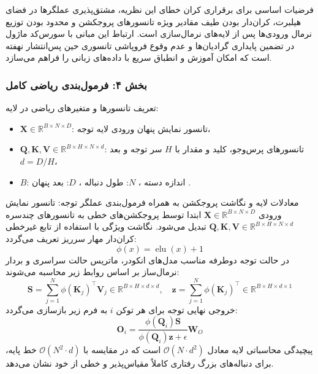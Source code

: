 فرضیات اساسی برای برقراری کران خطای این نظریه، مشتق‌پذیری عملگرها در فضای هیلبرت، کران‌دار بودن طیف مقادیر ویژه تانسورهای پروجکشن و محدود بودن توزیع نرمال ورودی‌ها پس از لایه‌های نرمال‌سازی  است.
ارتباط این مبانی با سورس‌کد ماژول  در تضمین پایداری گرادیان‌ها و عدم وقوع فروپاشی تانسوری حین پس‌انتشار نهفته است که امکان آموزش و انطباق سریع با داده‌های زبانی را فراهم می‌سازد.

\subsubsection*{بخش ۴: فرمول‌بندی ریاضی کامل }
تعریف تانسورها و متغیرهای ریاضی در لایه:
\begin{itemize}
    \item $\mathbf{X} \in \mathbb{R}^{B \times N \times D}$: تانسور نمایش پنهان ورودی لایه توجه،
    \item $\mathbf{Q}, \mathbf{K}, \mathbf{V} \in \mathbb{R}^{B \times H \times N \times d}$: تانسورهای پرس‌وجو، کلید و مقدار با $H$ سر توجه و بعد $d = D/H$،
    \item $B$: اندازه دسته ، $N$: طول دنباله ، $D$: بعد پنهان .
\end{itemize}
معادلات لایه و نگاشت پروجکشن به همراه فرمول‌بندی عملگر توجه:
تانسور نمایش ورودی $\mathbf{X} \in \mathbb{R}^{B \times N \times D}$ ابتدا توسط پروجکشن‌های خطی به تانسورهای چندسره $\mathbf{Q}, \mathbf{K}, \mathbf{V} \in \mathbb{R}^{B \times H \times N \times d}$ تبدیل می‌شود. نگاشت ویژگی با استفاده از تابع غیرخطی کران‌دار مهار سرریز تعریف می‌گردد:
\begin{equation}
\phi(x) = \operatorname{elu}(x) + 1
\end{equation}
در حالت توجه دوطرفه  مناسب مدل‌های انکودر، ماتریس حالت سراسری و بردار نرمال‌ساز بر اساس روابط زیر محاسبه می‌شوند:
\begin{equation}
\mathbf{S} = \sum_{j=1}^N \phi(\mathbf{K}_j)^\top \mathbf{V}_j \in \mathbb{R}^{B \times H \times d \times d}, \quad \mathbf{z} = \sum_{j=1}^N \phi(\mathbf{K}_j)^\top \in \mathbb{R}^{B \times H \times d \times 1}
\end{equation}
خروجی نهایی توجه برای هر توکن $i$ به فرم زیر بازسازی می‌گردد:
\begin{equation}
\mathbf{O}_i = \frac{\phi(\mathbf{Q}_i) \mathbf{S}}{\phi(\mathbf{Q}_i) \mathbf{z} + \epsilon} \mathbf{W}_O
\end{equation}
پیچیدگی محاسباتی لایه معادل $\mathcal{O}(N \cdot d^2)$ است که در مقایسه با $\mathcal{O}(N^2 \cdot d)$ خط پایه، برای دنباله‌های بزرگ رفتاری کاملاً مقیاس‌پذیر و خطی از خود نشان می‌دهد.

